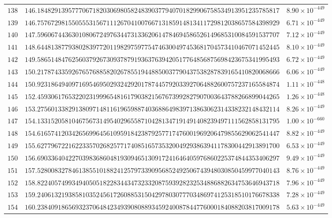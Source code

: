 \documentclass[12pt,reqno]{amsart}
\theoremstyle{remark}
\begin{document}
\begin{longtable}{clc}
$138$ & $146.1848291395777067182030698058248390377940701829906758534913951235785817$ & $8.90\times 10^{-449}$ \\
$139$ & $146.7576729815505553156711126704100766713185914813411729812038657584398929$ & $6.71\times 10^{-449}$ \\
$140$ & $147.5960674436301080672497634473133620614784694586526149685310084591537707$ & $7.12\times 10^{-449}$ \\
$141$ & $148.6448138779380283977201198297597754746300497453681704573410467071452445$ & $8.10\times 10^{-449}$ \\
$142$ & $149.5865148476256037926730937879193637639420517764856875698423675341995493$ & $6.72\times 10^{-449}$ \\
$143$ & $150.2178743359267657688582026785519448850037790437538287839165410820068666$ & $6.06\times 10^{-449}$ \\
$144$ & $150.9231864940971695469502932429201787445792033927064882600757237165584874$ & $1.11\times 10^{-448}$ \\
$145$ & $152.4593061765322023199965481617903821567673992827907003643788266899044265$ & $1.26\times 10^{-448}$ \\
$146$ & $153.2756013382913809714811619659887403688649839713863062314338232148432114$ & $8.26\times 10^{-449}$ \\
$147$ & $154.1331520581046756731495402965587104281347191491408239497111562858131795$ & $1.00\times 10^{-660}$ \\
$148$ & $154.6165741203426569964561095918423879257717476001969206479855629062541447$ & $8.82\times 10^{-449}$ \\
$149$ & $155.6277967221622335702682577174085165735320049293863941178300442913891700$ & $6.53\times 10^{-449}$ \\
$150$ & $156.6903364042270398368604819309465130917241646405976860225374844353406297$ & $9.49\times 10^{-449}$ \\
$151$ & $157.5280083278461385510188241257973390956852492506743948030850459977040143$ & $8.76\times 10^{-449}$ \\
$152$ & $158.8224057499349405051822834434732332087593928232534886882634753646943718$ & $7.96\times 10^{-449}$ \\
$153$ & $159.2406132193858103524561726088531504297803077703486974125318510176678338$ & $7.28\times 10^{-449}$ \\
$154$ & $160.2384091865693237064842349390808893459240087844776000184088203817009178$ & $5.63\times 10^{-449}$ \\

\end{longtable}
\end{document}
